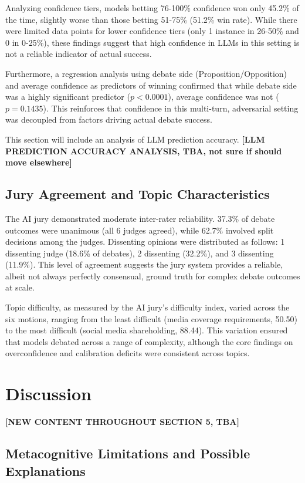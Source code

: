 \documentclass{article}
\begin{document}
Analyzing confidence tiers, models betting 76-100\% confidence won only 45.2\% of the time, slightly worse
than those betting 51-75\% (51.2\% win rate). While there were limited data points for lower confidence tiers
(only 1 instance in 26-50\% and 0 in 0-25\%), these findings suggest that high confidence in LLMs in this
setting is not a reliable indicator of actual success.

Furthermore, a regression analysis using debate side (Proposition/Opposition) and average confidence as
predictors of winning confirmed that while debate side was a highly significant predictor ($p < 0.0001$),
average confidence was not ($p = 0.1435$). This reinforces that confidence in this multi-turn, adversarial
setting was decoupled from factors driving actual debate success.

This section will include an analysis of LLM prediction accuracy. \textbf{[LLM PREDICTION ACCURACY ANALYSIS, TBA, not sure if should move elsewhere]}

\subsection{Jury Agreement and Topic Characteristics}

The AI jury demonstrated moderate inter-rater reliability. 37.3\% of debate outcomes were unanimous (all 6 judges agreed), while 62.7\% involved split decisions among the judges. Dissenting opinions were distributed as follows: 1 dissenting judge (18.6\% of debates), 2 dissenting (32.2\%), and 3 dissenting (11.9\%). This level of agreement suggests the jury system provides a reliable, albeit not always perfectly consensual, ground truth for complex debate outcomes at scale.

Topic difficulty, as measured by the AI jury's difficulty index, varied across the six motions, ranging from the least difficult (media coverage requirements, 50.50) to the most difficult (social media shareholding, 88.44). This variation ensured that models debated across a range of complexity, although the core findings on overconfidence and calibration deficits were consistent across topics.

\section{Discussion}
\textbf{[NEW CONTENT THROUGHOUT SECTION 5, TBA]}

\subsection{Metacognitive Limitations and Possible Explanations}
\end{document}

